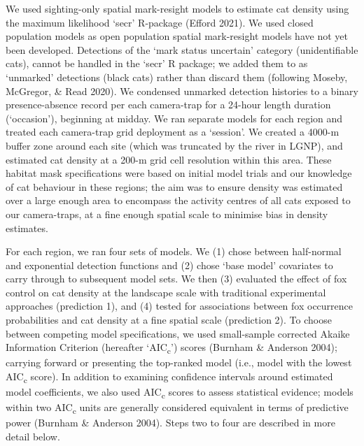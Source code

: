 \documentclass[preprint, 3p, authoryear]{elsarticle} %
\begin{document}
We used sighting-only spatial mark-resight models to estimate cat density using the maximum likelihood `secr' R-package (Efford 2021). We used closed population models as open population spatial mark-resight models have not yet been developed. Detections of the `mark status uncertain' category (unidentifiable cats), cannot be handled in the `secr' R package; we added them to as `unmarked' detections (black cats) rather than discard them (following Moseby, McGregor, \& Read 2020). We condensed unmarked detection histories to a binary presence-absence record per each camera-trap for a 24-hour length duration (`occasion'), beginning at midday. We ran separate models for each region and treated each camera-trap grid deployment as a `session'. We created a 4000-m buffer zone around each site (which was truncated by the river in LGNP), and estimated cat density at a 200-m grid cell resolution within this area. These habitat mask specifications were based on initial model trials and our knowledge of cat behaviour in these regions; the aim was to ensure density was estimated over a large enough area to encompass the activity centres of all cats exposed to our camera-traps, at a fine enough spatial scale to minimise bias in density estimates.

For each region, we ran four sets of models. We (1) chose between half-normal and exponential detection functions and (2) chose `base model' covariates to carry through to subsequent model sets. We then (3) evaluated the effect of fox control on cat density at the landscape scale with traditional experimental approaches (prediction 1), and (4) tested for associations between fox occurrence probabilities and cat density at a fine spatial scale (prediction 2). To choose between competing model specifications, we used small-sample corrected Akaike Information Criterion (hereafter `AIC\textsubscript{c}') scores (Burnham \& Anderson 2004); carrying forward or presenting the top-ranked model (i.e., model with the lowest AIC\textsubscript{c} score). In addition to examining confidence intervals around estimated model coefficients, we also used AIC\textsubscript{c} scores to assess statistical evidence; models within two AIC\textsubscript{c} units are generally considered equivalent in terms of predictive power (Burnham \& Anderson 2004). Steps two to four are described in more detail below.
\end{document}
